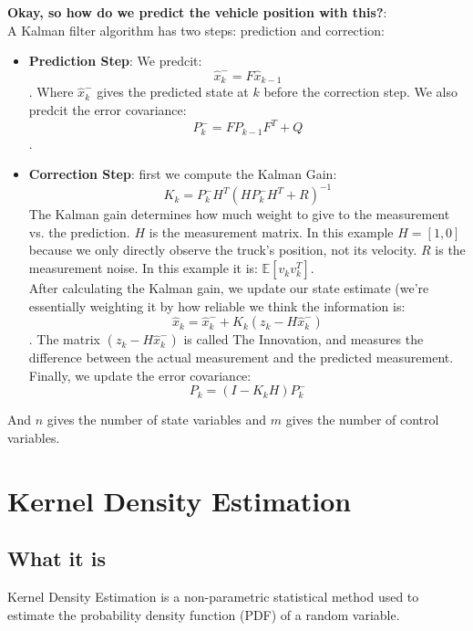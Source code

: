 \documentclass[12pt]{article}
\begin{document}
\textbf{Okay, so how do we predict the vehicle position with this?}:\\
A Kalman filter algorithm has two steps: prediction and correction:
\begin{itemize}
\item \textbf{Prediction Step}: We predcit: \[\hat{x}_k^- = F\hat{x}_{k-1}\]. Where \(\hat{x}_k^-\) gives the predicted state at \(k\) before the correction step. We also predcit the error covariance: \[P_k^- = FP_{k-1}F^T + Q\].
\item \textbf{Correction Step}: first we compute the Kalman Gain: \[K_k = P_k^-H^T(HP_k^-H^T + R)^{-1}\] The Kalman gain determines how much weight to give to the measurement vs. the prediction. \(H\) is the measurement matrix. In this example \(H = [1, 0]\) because we only directly observe the truck's position, not its velocity. \(R\) is the measurement noise. In this example it is: \(\mathbb{E}[v_kv_k^T]\). \\

After calculating the Kalman gain, we update our state estimate (we're essentially weighting it by how reliable we think the information is: \[\hat{x}_k = \hat{x}_k^- + K_k(z_k - H\hat{x}_k^-)\]. The matrix \((z_k - H\hat{x}_k^-)\) is called The Innovation, and measures the difference between the actual measurement and the predicted measurement. \\

Finally, we update the error covariance: \[P_k = (I - K_kH) P_k^-\]
\end{itemize}

And \(n\) gives the number of state variables and \(m\) gives the number of control variables.
\section{Kernel Density Estimation}

\subsection{What it is}
Kernel Density Estimation is a non-parametric statistical method used to estimate the probability density function (PDF) of a random variable. 
\end{document}
